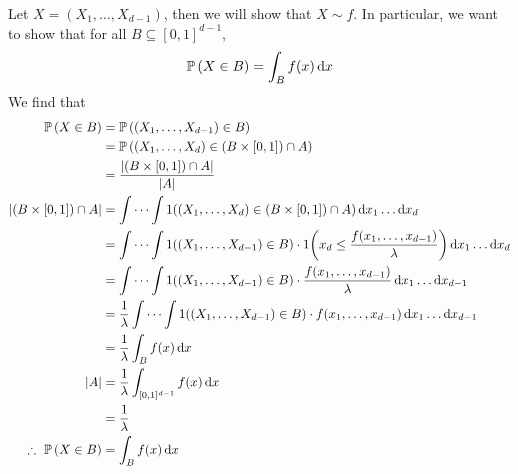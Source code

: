 Let \(X = (X_1, \dots, X_{d-1})\), then we will show that \(X \sim f\).
In particular, we want to show that for all \(B \subseteq [0, 1]^{d-1}\),
\[
	\mathbb{P}\left({X \in B}\right) = \int_B f(x) \dd{x}
\]
We find that
\begin{align*}
	\mathbb{P}\left({X \in B}\right)                 & = \mathbb{P}\left({(X_1, \dots, X_{d-1}) \in B}\right)                                                                                           \\
	                               & = \mathbb{P}\left({(X_1, \dots, X_d) \in (B \times [0, 1]) \cap A}\right)                                                                        \\
	                               & = \frac{\abs{(B \times [0, 1]) \cap A}}{\abs{A}}                                                                               \\
	\abs{(B \times [0, 1]) \cap A} & = \idotsint 1((X_1, \dots, X_d) \in (B \times [0, 1]) \cap A) \dd{x_1} \dots \dd{x_d}                                          \\
	                               & = \idotsint 1((X_1, \dots, X_{d-1}) \in B)\cdot 1\qty(x_d \leq \frac{f(x_1, \dots, x_{d-1})}{\lambda}) \dd{x_1} \dots \dd{x_d} \\
	                               & = \idotsint 1((X_1, \dots, X_{d-1}) \in B)\cdot \frac{f(x_1, \dots, x_{d-1})}{\lambda} \dd{x_1} \dots \dd{x_{d-1}}             \\
	                               & = \frac{1}{\lambda} \idotsint 1((X_1, \dots, X_{d-1}) \in B)\cdot f(x_1, \dots, x_{d-1}) \dd{x_1} \dots \dd{x_{d-1}}           \\
	                               & = \frac{1}{\lambda} \int_B f(x) \dd{x}                                                                                         \\
	\abs{A}                        & = \frac{1}{\lambda} \int_{[0,1]^{d-1}} f(x) \dd{x}                                                                             \\
	                               & = \frac{1}{\lambda}                                                                                                            \\
	\therefore\ \mathbb{P}\left({X \in B}\right)      & = \int_B f(x) \dd{x}
\end{align*}
